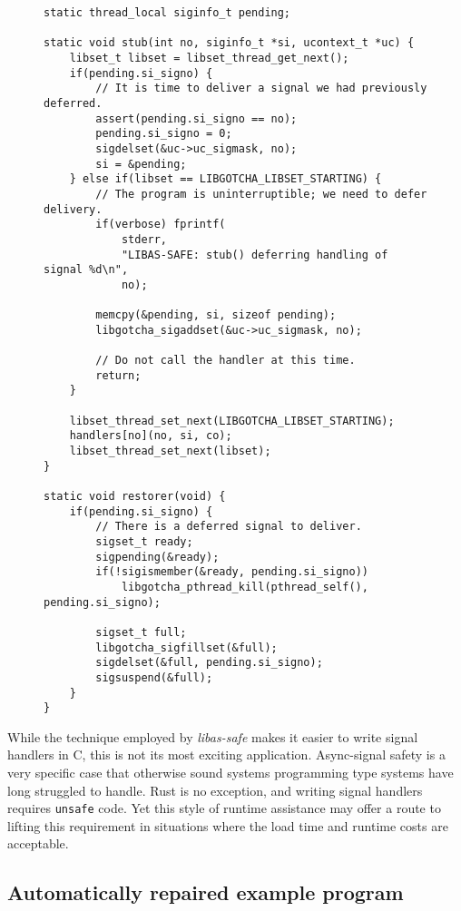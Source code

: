 \begin{figure}
\begin{lstlisting}[label=lst:assafe_helpers,caption=\textit{libas-safe}'s signal handler wrapper and control library callback,morekeywords=thread_local]
static thread_local siginfo_t pending;

static void stub(int no, siginfo_t *si, ucontext_t *uc) {
	libset_t libset = libset_thread_get_next();
	if(pending.si_signo) {
		// It is time to deliver a signal we had previously deferred.
		assert(pending.si_signo == no);
		pending.si_signo = 0;
		sigdelset(&uc->uc_sigmask, no);
		si = &pending;
	} else if(libset == LIBGOTCHA_LIBSET_STARTING) {
		// The program is uninterruptible; we need to defer delivery.
		if(verbose) fprintf(
			stderr,
			"LIBAS-SAFE: stub() deferring handling of signal %d\n",
			no);

		memcpy(&pending, si, sizeof pending);
		libgotcha_sigaddset(&uc->uc_sigmask, no);

		// Do not call the handler at this time.
		return;
	}

	libset_thread_set_next(LIBGOTCHA_LIBSET_STARTING);
	handlers[no](no, si, co);
	libset_thread_set_next(libset);
}

static void restorer(void) {
	if(pending.si_signo) {
		// There is a deferred signal to deliver.
		sigset_t ready;
		sigpending(&ready);
		if(!sigismember(&ready, pending.si_signo))
			libgotcha_pthread_kill(pthread_self(), pending.si_signo);

		sigset_t full;
		libgotcha_sigfillset(&full);
		sigdelset(&full, pending.si_signo);
		sigsuspend(&full);
	}
}
\end{lstlisting}
\end{figure}

While the technique employed by \textit{libas-safe} makes it easier to write signal
handlers in C, this is not its most exciting application.  Async-signal safety is a
very specific case that otherwise sound systems programming type systems have long
struggled to handle.  Rust is no exception, and writing signal handlers requires
\texttt{unsafe} code.  Yet this style of runtime assistance may offer a route to
lifting this requirement in situations where the load time and runtime costs are
acceptable.


\subsection{Automatically repaired example program}

